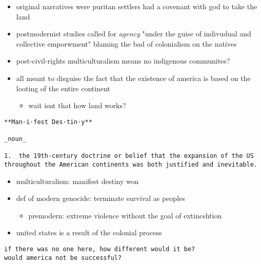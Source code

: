 \documentclass[letterpaper]{article}
\begin{document}
\begin{itemize}
\item original narratives were puritan settlers had a covenant with god to
take the land

\item postmodernist studies called for \emph{agency} "under the guise of
indivudual and collective emporwment" blaming the bad of colonialism
on the natives

\item post-civil-rights multiculturalism means no indigenous communites?

\item all meant to disguise the fact that the existence of america is based
on the looting of the entire continent

\begin{itemize}
\item wait isnt that how land works?
\end{itemize}
\end{itemize}

\begin{verbatim}
**Man·i·fest Des·tin·y**

_noun_

1.  the 19th-century doctrine or belief that the expansion of the US throughout the American continents was both justified and inevitable.
\end{verbatim}

\begin{itemize}
\item multiculturalism: manifest destiny won
\item def of modern genocide: terminate survival as peoples

\begin{itemize}
\item premodern: extreme violence without the goal of extincshtion
\end{itemize}

\item united states is a result of the colonial process
\end{itemize}

\begin{verbatim}
if there was no one here, how different would it be?
would america not be successful?
\end{verbatim}
\end{document}
